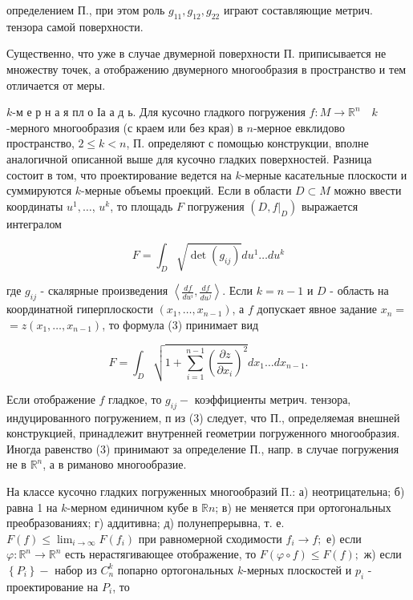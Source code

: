 \documentclass[10pt]{article}
\begin{document}
определением П., при этом роль $g_{11}, g_{12}, g_{22}$ играют составляющие метрич. тензора самой поверхности.



Существенно, что уже в случае двумерной поверхности П. приписывается не множеству точек, а отображению двумерного многообразия в пространство и тем отличается от меры.



$k$-м е р н а я пл о Іа а д ь. Для кусочно гладкого погружения $f: M \rightarrow \mathbb{R}^{n} \quad k$-мерного многообразия (с краем или без края) в $n$-мерное евклидово пространство, $2 \leqslant k<n$, П. определяют с помощью конструкции, вполне аналогичной описанной выше для кусочно гладких поверхностей. Разница состоит в том, что проектирование ведется на $k$-мерные касательные плоскости и суммируются $k$-мерные объемы проекций. Если в области $D \subset M$ можно ввести координаты $u^{1}, \ldots$, $u^{k}$, то площадь $F$ погружения $\left(D,\left.f\right|_{D}\right)$ выражается интегралом



\[

F=\int_{D} \sqrt{\operatorname{det}\left(g_{i j}\right)} d u^{1} \ldots d u^{k}

\]



где $g_{i j}$ - скалярные произведения $\left\langle\frac{d f}{d u^{i}}, \frac{d f}{d u^{j}}\right\rangle$. Если $k=n-1$ и $D$ - область на координатной гиперплоскости $\left(x_{1}, \ldots, x_{n-1}\right)$, а $f$ допускает явное задание $x_{n}=$ $=z\left(x_{1}, \ldots, x_{n-1}\right)$, то формула (3) принимает вид



\[

F=\int_{D} \sqrt{1+\sum_{i=1}^{n-1}\left(\frac{\partial z}{\partial x_{i}}\right)^{2}} d x_{1} \ldots d x_{n-1} .

\]



Если отображение $f$ гладкое, то $g_{i j}-$ коэффициенты метрич. тензора, индуцированного погружением, п из (3) следует, что П., определяемая внешней конструкцией, принадлежит внутренней геометрии погруженного многообразия. Иногда равенство (3) принимают за определение П., напр. в случае погружения не в $\mathbb{R}^{n}$, а в риманово многообразие.



На классе кусочно гладких погруженных многообразий П.: а) неотрицательна; б) равна 1 на $k$-мерном единичном кубе в $\mathbb{R} n$; в) не меняется при ортогональных преобразованиях; г) аддитивна; д) полунепрерывна, т. е. $F(f) \leqslant \lim _{i \rightarrow \infty} F\left(f_{i}\right)$ при равномерной сходимости $f_{i} \rightarrow f ;$ е) если $\varphi: \mathbb{R}^{n} \rightarrow \mathbb{R}^{n}$ есть нерастягивающее отображение, то $F(\varphi \circ f) \leqslant F(f) ;$ ж) если $\left\{P_{i}\right\}-$ набор из $C_{n}^{k}$ попарно ортогональных $k$-мерных плоскостей и $p_{i}$ - проектирование на $P_{i}$, то
\end{document}
